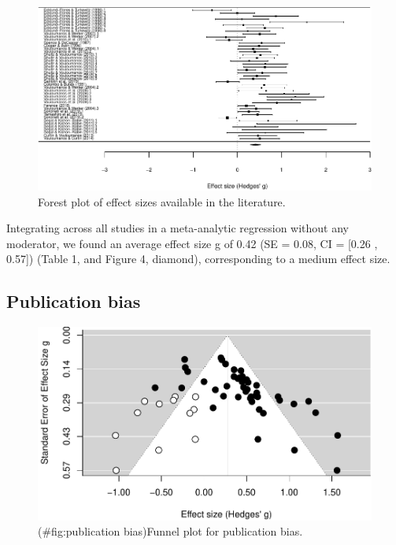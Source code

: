 \documentclass[man]{apa6}
\begin{document}
\begin{figure}
\centering
\includegraphics{MA_speech_pref_files/figure-latex/forest-1.pdf}
\caption{\label{fig:forest}Forest plot of effect sizes available in the
literature.}
\end{figure}

Integrating across all studies in a meta-analytic regression without any
moderator, we found an average effect size g of 0.42 (SE = 0.08, CI =
{[}0.26 , 0.57{]}) (Table 1, and Figure 4, diamond), corresponding to a
medium effect size.

\subsection{Publication bias}\label{publication-bias}

\begin{figure}
\centering
\includegraphics{MA_speech_pref_files/figure-latex/publication bias-1.pdf}
\caption{(\#fig:publication bias)Funnel plot for publication bias.}
\end{figure}
\end{document}
